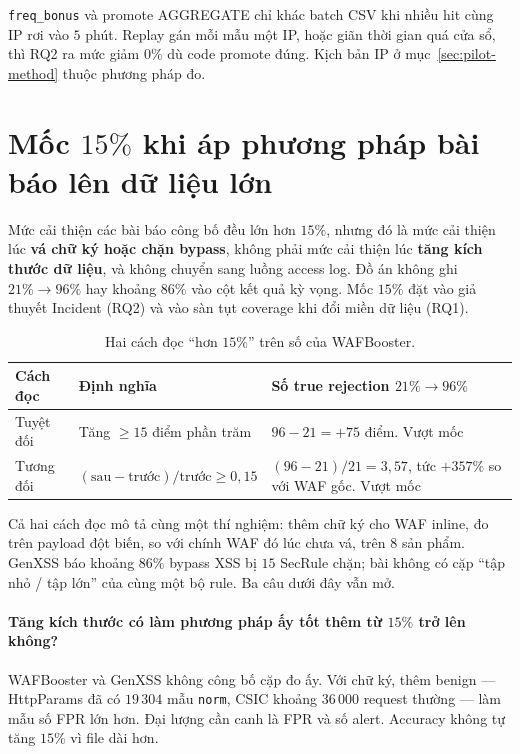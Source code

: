 \documentclass[a4paper,11pt]{article}
\begin{document}
\texttt{freq\_bonus} và promote AGGREGATE chỉ khác batch CSV khi nhiều hit cùng IP rơi vào $5$ phút. Replay gán mỗi mẫu một IP, hoặc giãn thời gian quá cửa sổ, thì RQ2 ra mức giảm $0\%$ dù code promote đúng. Kịch bản IP ở mục~\ref{sec:pilot-method} thuộc phương pháp đo.

\section{Mốc $15\%$ khi áp phương pháp bài báo lên dữ liệu lớn}
\label{sec:fifteen}

Mức cải thiện các bài báo công bố đều lớn hơn $15\%$, nhưng đó là mức cải thiện lúc \textbf{vá chữ ký hoặc chặn bypass}, không phải mức cải thiện lúc \textbf{tăng kích thước dữ liệu}, và không chuyển sang luồng access log. Đồ án không ghi $21\% \rightarrow 96\%$ hay khoảng $86\%$ vào cột kết quả kỳ vọng. Mốc $15\%$ đặt vào giả thuyết Incident (RQ2) và vào sàn tụt coverage khi đổi miền dữ liệu (RQ1).

\begin{table}[ht]
\centering
\caption{Hai cách đọc ``hơn $15\%$'' trên số của WAFBooster.}
\label{tab:fifteen}
\small
\begin{tabularx}{\linewidth}{@{}p{2.6cm}Y Y@{}}
\toprule
Cách đọc & Định nghĩa & Số true rejection $21\% \rightarrow 96\%$ \\
\midrule
Tuyệt đối & Tăng $\geq 15$ điểm phần trăm & $96-21 = +75$ điểm. Vượt mốc \\
Tương đối & $(\mathrm{sau}-\mathrm{trước})/\mathrm{trước} \geq 0{,}15$ & $(96-21)/21 = 3{,}57$, tức $+357\%$ so với WAF gốc. Vượt mốc \\
\bottomrule
\end{tabularx}
\end{table}

Cả hai cách đọc mô tả cùng một thí nghiệm: thêm chữ ký cho WAF inline, đo trên payload đột biến, so với chính WAF đó lúc chưa vá, trên $8$ sản phẩm. GenXSS báo khoảng $86\%$ bypass XSS bị $15$ SecRule chặn; bài không có cặp ``tập nhỏ / tập lớn'' của cùng một bộ rule. Ba câu dưới đây vẫn mở.

\paragraph{Tăng kích thước có làm phương pháp ấy tốt thêm từ $15\%$ trở lên không?}
WAFBooster và GenXSS không công bố cặp đo ấy. Với chữ ký, thêm benign --- HttpParams đã có $19\,304$ mẫu \texttt{norm}, CSIC khoảng $36\,000$ request thường --- làm mẫu số FPR lớn hơn. Đại lượng cần canh là FPR và số alert. Accuracy không tự tăng $15\%$ vì file dài hơn.
\end{document}
